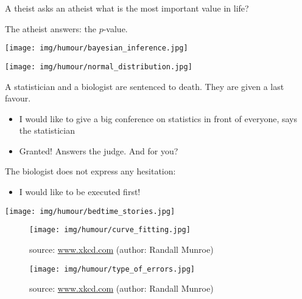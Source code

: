 	\begin{center}\underline{\hspace{5 cm}}\end{center}	
	A theist asks an atheist what is the most important value in life?

	The atheist answers: the $p$-value.
		
	\begin{center}
	\texttt{[image: img/humour/bayesian\_inference.jpg]}
	\end{center}
	
	\begin{center}\underline{\hspace{5 cm}}\end{center}
	\begin{center}
	\texttt{[image: img/humour/normal\_distribution.jpg]}
	\end{center}
	\begin{center}\underline{\hspace{5 cm}}\end{center}
	
	A statistician and a biologist are sentenced to death. They are given a last favour.
	\begin{itemize}
		\item I would like to give a big conference on statistics in front of everyone, says the statistician
		\item Granted! Answers the judge. And for you?
	\end{itemize}
	The biologist does not express any hesitation:
	\begin{itemize}
		\item I would like to be executed first!
	\end{itemize}

	
	\begin{center}
	\texttt{[image: img/humour/bedtime\_stories.jpg]}
	\end{center}
	
	\begin{center}\underline{\hspace{5 cm}}\end{center}

	\begin{figure}[H]
		\centering
		\texttt{[image: img/humour/curve\_fitting.jpg]}
		\caption[]{source: \url{www.xkcd.com} (author: Randall Munroe)}
	\end{figure}
	
	\begin{figure}[H]
		\centering
		\texttt{[image: img/humour/type\_of\_errors.jpg]}
		\caption[]{source: \url{www.xkcd.com} (author: Randall Munroe)}
	\end{figure}
	
